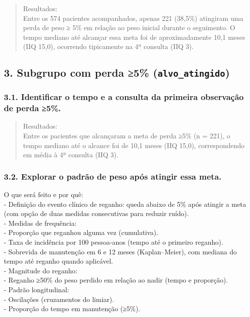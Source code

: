 \documentclass[
]{article}
\begin{document}
\begin{quote}
Resultados:\\
Entre os 574 pacientes acompanhados, apenas 221 (38,5\%) atingiram uma
perda de peso ≥ 5\% em relação ao peso inicial durante o seguimento. O
tempo mediano até alcançar essa meta foi de aproximadamente 10,1 meses
(IIQ 15,0), ocorrendo tipicamente na 4ª consulta (IIQ 3).\\
\end{quote}

\subsection{\texorpdfstring{3. Subgrupo com perda ≥5\%
(\texttt{alvo\_atingido})}{3. Subgrupo com perda ≥5\% (alvo\_atingido)}}\label{subgrupo-com-perda-5-alvo_atingido}

\subsubsection{3.1. Identificar o tempo e a consulta da primeira
observação de perda
≥5\%.}\label{identificar-o-tempo-e-a-consulta-da-primeira-observauxe7uxe3o-de-perda-5.}

\begin{quote}
Resultados:\\
Entre os pacientes que alcançaram a meta de perda ≥5\% (n = 221), o
tempo mediano até o alcance foi de 10,1 meses (IIQ 15,0), correspondendo
em média à 4ª consulta (IIQ 3).\\
\end{quote}

\subsubsection{3.2. Explorar o padrão de peso após atingir essa
meta.}\label{explorar-o-padruxe3o-de-peso-apuxf3s-atingir-essa-meta.}

O que será feito e por quê:\\
- Definição do evento clínico de reganho: queda abaixo de 5\% após
atingir a meta (com opção de duas medidas consecutivas para reduzir
ruído).\\
- Medidas de frequência:\\
- Proporção que reganhou alguma vez (cumulativa).\\
- Taxa de incidência por 100 pessoa‑anos (tempo até o primeiro
reganho).\\
- Sobrevida de manutenção em 6 e 12 meses (Kaplan--Meier), com mediana
do tempo até reganho quando aplicável.\\
- Magnitude do reganho:\\
- Reganho ≥50\% do peso perdido em relação ao nadir (tempo e
proporção).\\
- Padrão longitudinal:\\
- Oscilações (cruzamentos do limiar).\\
- Proporção do tempo em manutenção (≥5\%).\\
\end{document}
